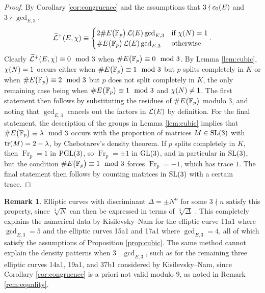 \documentclass{article}
\theoremstyle{plain}
\theoremstyle{definition}
\newtheorem{remark}[n]{Remark}
\newcommand{\FF}{\mathbb{F}}
\newcommand{\Fr}{\operatorname{Fr}}
\newcommand{\GL}{\operatorname{GL}}
\newcommand{\LLL}{\mathcal{L}}
\newcommand{\PGL}{\operatorname{PGL}}
\newcommand{\SL}{\operatorname{SL}}
\newcommand{\tr}{\operatorname{tr}}
\newcommand{\br}{\!\del}
\begin{document}
\begin{proof}
By Corollary \ref{cor:congruence} and the assumptions that $ 3 \nmid c_0\br{E} $ and $ 3 \nmid \gcd_{E, 3} $,
$$ \widetilde{\LLL}^+\br{E, \chi} \equiv
\begin{cases}
2\#E\br{\FF_p}\LLL\br{E}\gcd_{E, 3} & \text{if} \ \chi\br{N} = 1 \\
\#E\br{\FF_p}\LLL\br{E}\gcd_{E, 3} & \text{otherwise} \\
\end{cases}.
$$
Clearly $ \widetilde{\LLL}^+\br{E, \chi} \equiv 0 \mod 3 $ when $ \#E\br{\FF_p} \equiv 0 \mod 3 $. By Lemma \ref{lem:cubic}, $ \chi\br{N} = 1 $ occurs either when $ \#E\br{\FF_p} \equiv 1 \mod 3 $ but $ p $ splits completely in $ K $ or when $ \#E\br{\FF_p} \equiv 2 \mod 3 $ but $ p $ does not split completely in $ K $, the only remaining case being when $ \#E\br{\FF_p} \equiv 1 \mod 3 $ and $ \chi\br{N} \ne 1 $. The first statement then follows by substituting the residues of $ \#E\br{\FF_p} $ modulo $ 3 $, and noting that $ \gcd_{E, 3} $ cancels out the factors in $ \LLL\br{E} $ by definition. For the final statement, the description of the groups in Lemma \ref{lem:cubic} implies that $ \#E\br{\FF_p} \equiv \lambda \mod 3 $ occurs with the proportion of matrices $ M \in \SL\br{3} $ with $ \tr\br{M} = 2 - \lambda $, by Chebotarev's density theorem. If $ p $ splits completely in $ K $, then $ \Fr_p = 1 $ in $ \PGL\br{3} $, so $ \Fr_p = \pm1 $ in $ \GL\br{3} $, and in particular in $ \SL\br{3} $, but the condition $ \#E\br{\FF_p} \equiv 1 \mod 3 $ forces $ \Fr_p = -1 $, which has trace $ 1 $. The final statement then follows by counting matrices in $ \SL\br{3} $ with a certain trace.
\end{proof}

\begin{remark}
Elliptic curves with discriminant $ \Delta = \pm N^n $ for some $ 3 \nmid n $ satisfy this property, since $ \sqrt[3]{N} $ can then be expressed in terms of $ \sqrt[3]{\Delta} $ \cite[Section 5.3b]{Ser72}. This completely explains the numerical data by Kisilevsky--Nam for the elliptic curve 11a1 where $ \gcd_{E, 3} = 5 $ and the elliptic curves 15a1 and 17a1 where $ \gcd_{E, 3} = 4 $, all of which satisfy the assumptions of Proposition \ref{prop:cubic}. The same method cannot explain the density patterns when $ 3 \mid \gcd_{E, 3} $, such as for the remaining three elliptic curves 14a1, 19a1, and 37b1 considered by Kisilevsky--Nam, since Corollary \ref{cor:congruence} is a priori not valid modulo $ 9 $, as noted in Remark \ref{rem:equality}.
\end{remark}
\end{document}
